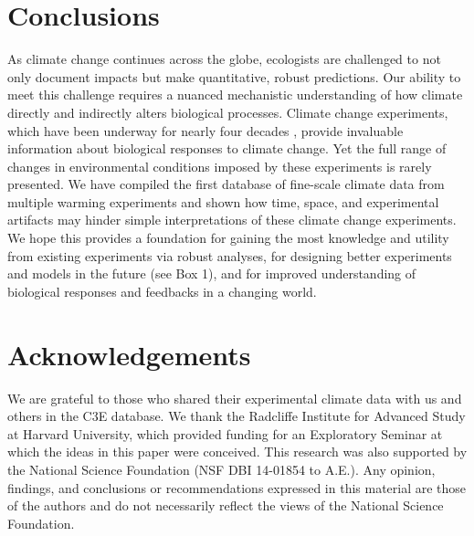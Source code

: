 \documentclass{article}
\begin{document}
\section* {Conclusions}
\par As climate change continues across the globe, ecologists are challenged to not only document impacts but make quantitative, robust predictions. Our ability to meet this challenge requires a nuanced mechanistic understanding of how climate directly and indirectly alters biological processes. Climate change experiments, which have been underway for nearly four decades \citep[e.g.,][]{tamaki1981,carlson1982}, provide invaluable information about biological responses to climate change. Yet the full range of changes in environmental conditions imposed by these experiments is rarely presented. We have compiled the first database of fine-scale climate data from multiple warming experiments and shown how time, space, and experimental artifacts may hinder simple interpretations of these climate change experiments. We hope this provides a foundation for gaining the most knowledge and utility from existing experiments via robust analyses, for designing better experiments and models in the future (see Box 1), and for improved understanding of biological responses and feedbacks in a changing world.
 \section* {Acknowledgements}
We are grateful to those who shared their experimental climate data with us and others in the C3E database. We thank the Radcliffe Institute for Advanced Study at Harvard University, which provided funding for an Exploratory Seminar at which the ideas in this paper were conceived. This research was also supported by the National Science Foundation (NSF DBI 14-01854 to A.E.). Any opinion, findings, and conclusions or recommendations expressed in this material are those of the authors and do not necessarily reflect the views of the National Science Foundation.
\end{document}
